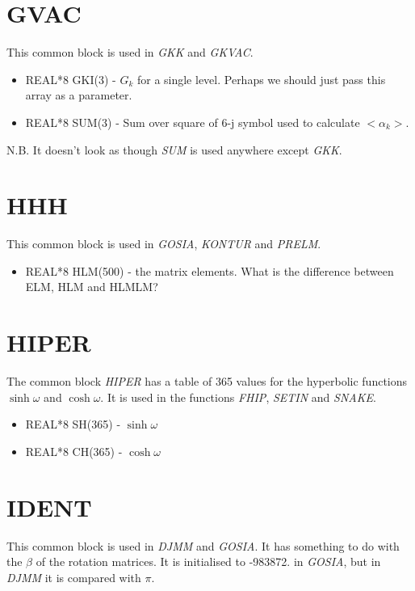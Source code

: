 \section{GVAC}

This common block is used in {\em GKK} and {\em GKVAC}.

\begin{itemize}
\item REAL*8 GKI(3) - $G_k$ for a single level. Perhaps we should just pass
this array as a parameter.
\item REAL*8 SUM(3) - Sum over square of 6-j symbol used to calculate
$<\alpha_k>$.
\end{itemize}

N.B. It doesn't look as though {\em SUM} is used anywhere except {\em GKK}.

\section{HHH}

This common block is used in {\em GOSIA}, {\em KONTUR} and {\em PRELM}.

\begin{itemize}
\item REAL*8 HLM(500) - the matrix elements. What is the difference between
ELM, HLM and HLMLM?
\end{itemize}

\section{HIPER}

The common block {\em HIPER} has a table of 365 values for the hyperbolic
functions $\sinh\omega$ and $\cosh\omega$. It is used in the functions {\em
FHIP}, {\em SETIN} and {\em SNAKE}.

\begin{itemize}
\item REAL*8 SH(365) - $\sinh\omega$
\item REAL*8 CH(365) - $\cosh\omega$
\end{itemize}

\section{IDENT}

This common block is used in {\em DJMM} and {\em GOSIA}. It has something to
do with the $\beta$ of the rotation matrices. It is initialised to -983872.
in {\em GOSIA}, but in {\em DJMM} it is compared with $\pi$.

